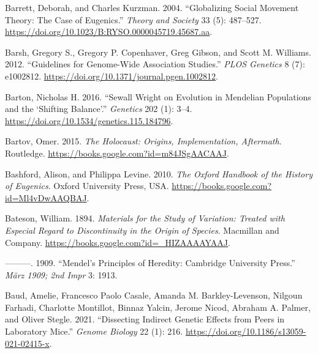 \documentclass[
]{book}
\newlength{\cslhangindent}
\newlength{\cslentryspacingunit} %
\newenvironment{CSLReferences}[2] %
 {%
  \setlength{\parindent}{0pt}
  \ifodd #1
  \let\oldpar\par
  \def\par{\hangindent=\cslhangindent\oldpar}
  \fi
  \setlength{\parskip}{#2\cslentryspacingunit}
 }%
 {}
\begin{document}
\begin{CSLReferences}{1}{0}
\leavevmode{}%
Barrett, Deborah, and Charles Kurzman. 2004. {``Globalizing Social Movement Theory: {The} Case of Eugenics.''} \emph{Theory and Society} 33 (5): 487--527. \url{https://doi.org/10.1023/B:RYSO.0000045719.45687.aa}.

\leavevmode{}%
Barsh, Gregory S., Gregory P. Copenhaver, Greg Gibson, and Scott M. Williams. 2012. {``Guidelines for {Genome-Wide Association Studies}.''} \emph{PLOS Genetics} 8 (7): e1002812. \url{https://doi.org/10.1371/journal.pgen.1002812}.

\leavevmode{}%
Barton, Nicholas H. 2016. {``Sewall {Wright} on {Evolution} in {Mendelian Populations} and the {`{Shifting Balance}'}.''} \emph{Genetics} 202 (1): 3--4. \url{https://doi.org/10.1534/genetics.115.184796}.

\leavevmode{}%
Bartov, Omer. 2015. \emph{The {Holocaust}: {Origins}, {Implementation}, {Aftermath}}. {Routledge}. \url{https://books.google.com?id=m84JSgAACAAJ}.

\leavevmode{}%
Bashford, Alison, and Philippa Levine. 2010. \emph{The {Oxford Handbook} of the {History} of {Eugenics}}. {Oxford University Press, USA}. \url{https://books.google.com?id=Ml4vDwAAQBAJ}.

\leavevmode{}%
Bateson, William. 1894. \emph{Materials for the {Study} of {Variation}: {Treated} with {Especial Regard} to {Discontinuity} in the {Origin} of {Species}}. {Macmillan and Company}. \url{https://books.google.com?id=_HIZAAAAYAAJ}.

\leavevmode{}%
---------. 1909. {``Mendel's {Principles} of {Heredity}: {Cambridge University Press}.''} \emph{März 1909; 2nd Impr} 3: 1913.

\leavevmode{}%
Baud, Amelie, Francesco Paolo Casale, Amanda M. Barkley-Levenson, Nilgoun Farhadi, Charlotte Montillot, Binnaz Yalcin, Jerome Nicod, Abraham A. Palmer, and Oliver Stegle. 2021. {``Dissecting Indirect Genetic Effects from Peers in Laboratory Mice.''} \emph{Genome Biology} 22 (1): 216. \url{https://doi.org/10.1186/s13059-021-02415-x}.


\end{CSLReferences}
\end{document}
